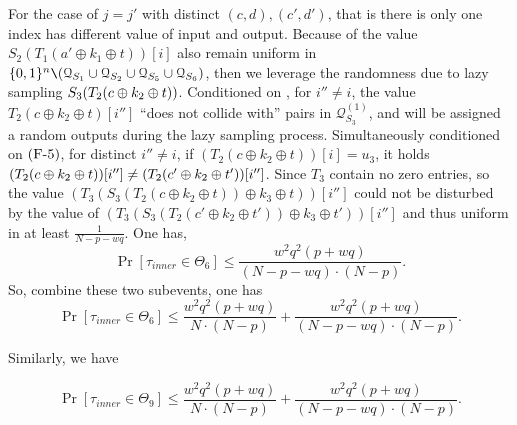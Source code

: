 For the case of $j=j'$ with distinct $(c,d),(c',d')$, that is there is only one index has different value of input and output. Because of the value $S_{2}\left(T_1\left(a' \oplus k_{1} \oplus t\right)\right)[i]$ also remain uniform in $\{0, 1\}^{n} \verb|\| (\mathcal{Q}_{S_{1}} \cup \mathcal{Q}_{S_{2}} \cup \mathcal{Q}_{S_{5}} \cup \mathcal{Q}_{S_{6}})$, then we leverage the randomness due to lazy sampling $S_3(T_2(c\oplus k_2\oplus t))$. Conditioned on \feaiv, for $i''\neq i$, the value $T_2(c \oplus k_2 \oplus t)[i'']$ ``does not collide with'' pairs in $\mathcal{Q}_{S_{3}}^{(1)}$, and will be assigned a random outputs during the lazy sampling process. Simultaneously conditioned on $\text{(F-5)}$, for distinct $i'' \neq i$, if $(T_2\left(c \oplus k_{2} \oplus t\right))[i] = u_3$, it holds $(T_2(c\oplus k_2 \oplus t))[i'']\neq (T_2(c'\oplus k_2 \oplus t'))[i'']$. Since $T_3$ contain no zero entries, so the value $ \left(T_{3}\left(S_{3}\left(T_2\left(c \oplus k_{2} \oplus t\right)\right) \oplus k_{3} \oplus t\right)\right)[i'']$ could not be disturbed by the value of $ \left(T_{3}\left(S_{3}\left(T_2\left(c' \oplus k_{2} \oplus t'\right)\right) \oplus k_{3} \oplus t'\right)\right)[i'']$ and thus uniform in at least $\frac{1}{N - p- wq}$. One has,
$$
\operatorname{Pr}\left[\tau_{inner} \in \Theta_{6}\right] \leq \frac{w^{2} q^{2} (p+w q)}{(N- p- wq) \cdot (N-p)}.
$$
\noindent So, combine these two subevents, one has
$$
\operatorname{Pr}\left[\tau_{inner} \in \Theta_{6}\right] \leq \frac{w^{2} q^{2} (p+w q)}{N \cdot (N-p)} + \frac{w^{2} q^{2} (p+w q)}{(N- p- wq) \cdot (N- p)}.
$$

\noindent Similarly, we have

$$
\operatorname{Pr}\left[\tau_{inner} \in \Theta_{9}\right] \leq \frac{w^{2} q^{2} (p+w q)}{N \cdot (N-p)} + \frac{w^{2} q^{2} (p+w q)}{(N- p- wq) \cdot (N- p)}.
$$

















